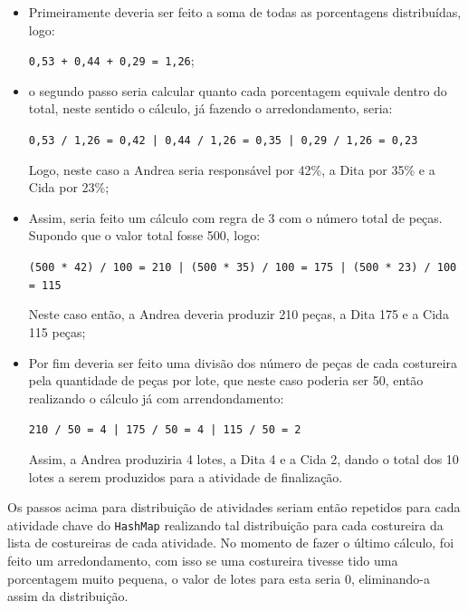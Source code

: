 \begin{itemize}
	\item Primeiramente deveria ser feito a soma de todas as porcentagens distribuídas, logo: 
	\par \texttt{0,53 + 0,44 + 0,29 = 1,26};
	
	\item o segundo passo seria calcular quanto cada porcentagem equivale dentro do total, neste 
	sentido o cálculo, já fazendo o arredondamento, seria: 
	\par \texttt{0,53 / 1,26 = 0,42 | 0,44 / 1,26 = 0,35 | 0,29 / 1,26 = 0,23}
	\par Logo, neste caso a Andrea seria responsável por 42\%, a Dita por 35\% e a Cida por 23\%;
	
	\item Assim, seria feito um cálculo com regra de 3 com o número total de peças. Supondo que o 
	 valor total fosse 500, logo:
	
	\par \texttt{(500 * 42) / 100 = 210 | (500 * 35) / 100 = 175 | (500 * 23) / 100 = 115}
	
	\par Neste caso então, a Andrea deveria produzir 210 peças, a Dita 175 e a Cida 115 peças;
	
	\item Por fim deveria ser feito uma divisão dos número de peças de cada costureira pela quantidade
     de peças por lote, que neste caso poderia ser 50, então realizando o cálculo já com arrendondamento:
     \par \texttt{210 / 50 = 4 | 175 / 50 = 4 | 115 / 50 = 2}
     
     \par Assim, a Andrea produziria 4 lotes, a Dita 4 e a Cida 2, dando o total
     dos 10 lotes a serem produzidos para a atividade de finalização.
	
\end{itemize}
 
 \par Os passos acima para distribuição de atividades seriam então repetidos
 para cada atividade chave do \texttt{HashMap} realizando tal distribuição para cada costureira da lista de 
 costureiras de cada atividade. No momento de fazer o último cálculo, foi feito
 um arredondamento, com isso se uma costureira tivesse tido uma porcentagem muito pequena, o valor de lotes para
 esta seria 0, eliminando-a assim da distribuição.
 
